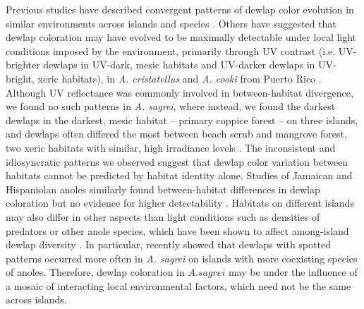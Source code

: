 Previous studies have described convergent patterns of dewlap color evolution in similar environments across islands and species \citep{Thorpe2002a, Thorpe2002b}. Others have suggested that dewlap coloration may have evolved to be maximally detectable under local light conditions imposed by the environment, primarily through UV contrast (i.e. UV-brighter dewlaps in UV-dark, mesic habitats and UV-darker dewlaps in UV-bright, xeric habitats), in \textit{A. cristatellus} and \textit{A. cooki} from Puerto Rico \citep{Leal2002, Leal2004}. Although UV reflectance was commonly involved in between-habitat divergence, we found no such patterns in \textit{A. sagrei}, where instead, we found the darkest dewlaps in the darkest, mesic habitat -- primary coppice forest -- on three islands, and dewlaps often differed the most between beach scrub and mangrove forest, two xeric habitats with similar, high irradiance levels \citep{Howard1950, Schoener1968}. The inconsistent and idiosyncratic patterns we observed suggest that dewlap color variation between habitats cannot be predicted by habitat identity alone. Studies of Jamaican and Hispaniolan anoles similarly found between-habitat differences in dewlap coloration but no evidence for higher detectability \citep{Fleishman2009, Ng2012}. Habitats on different islands may also differ in other aspects than light conditions such as densities of predators or other anole species, which have been shown to affect among-island dewlap diversity \citep{Vanhooydonck2009, Baeckens2018}. In particular, \citet{Baeckens2018} recently showed that dewlaps with spotted patterns occurred more often in \textit{A. sagrei} on islands with more coexisting species of anoles. Therefore, dewlap coloration in $A. sagrei$ may be under the influence of a mosaic of interacting local environmental factors, which need not be the same across islands.


